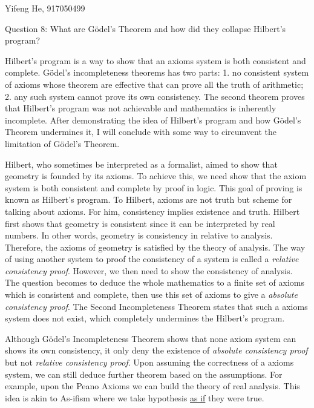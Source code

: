 \documentclass[11pt]{article}
\begin{document}
\begin{center}
    Yifeng He, 917050499
\end{center}

\begin{center}
    Question 8: What are G\"odel's Theorem and how did they collapse Hilbert's program?
\end{center}

Hilbert's program is a way to show that an axioms system is both consistent and complete.
G\"odel's incompleteness theorems has two parts:
1. no consistent system of axioms whose theorem are effective that can prove all the truth of arithmetic;
2. any such system cannot prove its own consistency.
The second theorem proves that Hilbert's program was not achievable and mathematics is inherently incomplete.
After demonstrating the idea of Hilbert's program and how G\"odel's Theorem undermines it,
I will conclude with some way to circumvent the limitation of G\"odel's Theorem.

Hilbert, who sometimes be interpreted as a formalist,
aimed to show that geometry is founded by its axioms.
To achieve this, we need show that the axiom system is both consistent and complete by proof in logic.
This goal of proving is known as Hilbert's program.
To Hilbert, axioms are not truth but scheme for talking about axioms.
For him, consistency implies existence and truth.
Hilbert first shows that geometry is consistent
since it can be interpreted by real numbers.
In other words, geometry is consistency in relative to analysis.
Therefore, the axioms of geometry is satisfied by the theory of analysis.
The way of using another system to proof the consistency of a system 
is called a \textit{relative consistency proof}.
However, we then need to show the consistency of analysis.
The question becomes to deduce the whole mathematics to a finite set of axioms which is consistent and complete,
then use this set of axioms to give a \textit{absolute consistency proof}.
The Second Incompleteness Theorem states that such a axioms system does not exist,
which completely undermines the Hilbert's program.

Although G\"odel's Incompleteness Theorem shows that none axiom system can shows its own consistency,
it only deny the existence of \textit{absolute consistency proof} but not \textit{relative consistency proof}.
Upon assuming the correctness of a axioms system,
we can still deduce further theorem based on the assumptions.
For example, upon the Peano Axioms we can build the theory of real analysis.
This idea is akin to As-ifism where
we take hypothesis \underline{as if} they were true.
\end{document}
